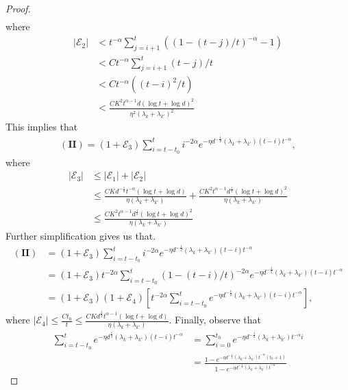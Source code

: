 \documentclass[11pt, reqno,english]{amsart}
\begin{document}
\begin{proof}
\begin{align*}
\end{align*}
where
\begin{align*}
    |\mathcal E_2| &< t^{-\alpha}\sum_{j = i+1}^t ((1 - (t-j)/t)^{-\alpha} - 1)
    \\ 
    &< Ct^{-\alpha} \sum_{j = i+1}^t (t-j)/t
    \\
    &< Ct^{-\alpha}((t-i)^2/t)
    \\
    &< \frac{CK^2 t^{\alpha - 1} d(\log t + \log d)^2}{\eta^2 (\lambda_k + \lambda_{k'})^2}
\end{align*}
This implies that
\begin{align*}
(\mathbf{II}) = (1 + \mathcal E_3)\sum_{i = t-t_0}^t i^{-2\alpha} e^{-\eta d^{-\frac{1}{2}}(\lambda_k + \lambda_{k'})(t-i)t^{-\alpha}},
\end{align*}
where 
\begin{align*}
|\mathcal E_3| &\leq |\mathcal E_1| + |\mathcal E_2|
\\
&\leq \frac{CK d^{-\frac{1}{2}}t^{-\alpha} (\log t + \log d)}{\eta (\lambda_k + \lambda_{k'})} + \frac{CK^2 t^{\alpha - 1} d^{\frac{1}{2}}(\log t + \log d)^2}{\eta (\lambda_k + \lambda_{k'})}
\\
&\leq \frac{CK^2 t^{\alpha - 1} d^{\frac{1}{2}}(\log t + \log d)^2}{\eta (\lambda_k + \lambda_{k'})}
\end{align*}
Further simplification gives us that.
\begin{align*}
(\mathbf{II}) &= (1 + \mathcal E_3)\sum_{i = t-t_0}^t i^{-2\alpha} e^{-\eta d^{-\frac{1}{2}}(\lambda_k + \lambda_{k'}) (t-i)t^{-\alpha}}
\\
&= (1 + \mathcal E_3)t^{-2\alpha}\sum_{i = t-t_0}^t (1 - (t-i)/t)^{-2\alpha} e^{-\eta d^{-\frac{1}{2}}(\lambda_k + \lambda_{k'}) (t-i)t^{-\alpha}}
\\
&= (1 + \mathcal E_3)(1 + \mathcal E_4)[t^{-2\alpha}\sum_{i = t-t_0}^t e^{-\eta d^{-\frac{1}{2}}(\lambda_k + \lambda_{k'}) (t-i)t^{-\alpha}}],
\end{align*}
where $|\mathcal E_4| \leq \frac{Ct_0}{t} \leq \frac{CK d^{\frac{1}{2}}t^{\alpha - 1}(\log t + \log d)}{\eta (\lambda_k  + \lambda_{k'})}$. Finally, observe that
\begin{align*}
\sum_{i = t-t_0}^t e^{-\eta d^{\frac{1}{2}}(\lambda_k + \lambda_{k'})(t-i)t^{-\alpha}} &= \sum_{i = 0}^{t_0} e^{-\eta d^{-\frac{1}{2}}(\lambda_k + \lambda_{k'})t^{-\alpha}i}
\\
&= \frac{1 - e^{-\eta d^{-\frac{1}{2}}(\lambda_k + \lambda_{k'})t^{-\alpha}(t_0 + 1)}}{1 - e^{-\eta d^{-\frac{1}{2}}(\lambda_k + \lambda_{k'})t^{-\alpha}}}

\end{align*}
\end{proof}
\end{document}
